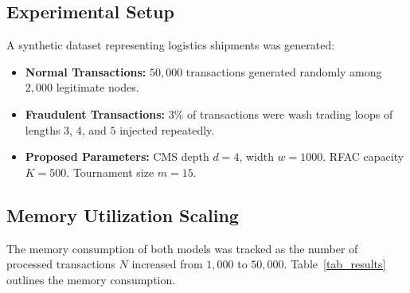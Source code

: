 \documentclass[conference]{IEEEtran}
\begin{document}
\subsection{Experimental Setup}
A synthetic dataset representing logistics shipments was generated:
\begin{itemize}
    \item \textbf{Normal Transactions:} $50,000$ transactions generated randomly among $2,000$ legitimate nodes.
    \item \textbf{Fraudulent Transactions:} $3\%$ of transactions were wash trading loops of lengths $3$, $4$, and $5$ injected repeatedly.
    \item \textbf{Proposed Parameters:} CMS depth $d=4$, width $w=1000$. RFAC capacity $K=500$. Tournament size $m=15$.
\end{itemize}

\subsection{Memory Utilization Scaling}
The memory consumption of both models was tracked as the number of processed transactions $N$ increased from $1,000$ to $50,000$. Table~\ref{tab_results} outlines the memory consumption.

\begin{table}[htbp]
\caption{Memory Utilization Scaling (KB)}
\label{tab_results}
\centering
{}
\end{table}
\end{document}
